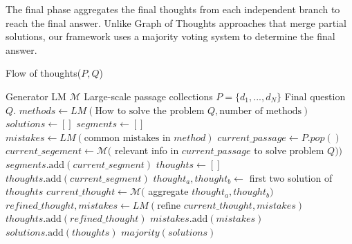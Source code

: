 \documentclass{article}
\begin{document}
The final phase aggregates the final thoughts from each independent branch to reach the final answer. Unlike Graph of Thoughts approaches that merge partial solutions, our framework uses a majority voting system to determine the final answer.

\begin{algorithm}
    \caption{Flow of thoughts($P,Q$)}\label{alg:cap}
    \begin{algorithmic}
        \Require Generator LM $\mathcal{M}$
        \Require Large-scale passage collections $P=\{d_1, . . . , d_N \}$
        \Require Final question $Q$.
        \State $methods\gets LM(\text{How to solve the problem } Q, \text{number of methods})$
        \State $solutions\gets []$
            \State $segments \gets []$
            \State $mistakes\gets LM(\text{common mistakes in } method)$
                    \State $current\_passage\gets P.pop()$
                    \State $current\_segement\gets \mathcal{M}($ relevant info in $current\_passage$ to solve problem $Q))$
                    \State $segments.\text{add}(current\_segment)$
                \EndIf
            \EndWhile
            \State $thoughts\gets[]$
                \State $thoughts.\text{add}(current\_segment)$
            \EndFor
                \State $thought_a,thought_b\gets$ first two solution of $thoughts$
                \State $current\_thought\gets\mathcal{M}($ aggregate $thought_a,thought_b)$ 
                \State $refined\_thought,mistakes\gets LM(\text{refine } current\_thought, mistakes)$
                \State $thoughts.\text{add}(refined\_thought)$
                \State $mistakes.\text{add}(mistakes)$
            \EndWhile
            \State $solutions.\text{add}(thoughts)$
        \EndFor
        \State \Return $majority(solutions)$

        
    \end{algorithmic}
    \end{algorithm}
\end{document}

